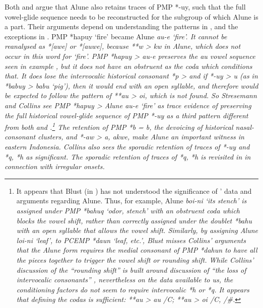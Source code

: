 Both \citet[139]{Stresemann1927} and \citet[51f]{Collins1983} argue
that Alune also retains traces of PMP *-uy,
such that the full vowel-glide sequence needs to be reconstructed
for the  subgroup of which Alune is a part.
Their arguments depend on understanding the patterns in ,
and the exceptions in .
PMP *hapuy ‘fire’ became Alune \it{au-e} ‘fire’.
It cannot be reanalysed as *[awe] or *[auwe],
because **w > \it{kw} in Alune,
which does not occur in this word for ‘fire’.
PMP *hapuy > \it{au-e} preserves the \it{au} vowel sequence seen
in example , but it does not have an obstruent as the coda which conditions that.
It does lose the intervocalic historical consonant *p > {\0}
and if *-uy > \it{u} (as in *babuy > \it{babu} ‘pig’),
then it would end with an open syllable,
and therefore would be expected to follow the pattern of **au
> \it{oi}, which is not found.
So Stresemann and Collins see PMP *hapuy > Alune \it{au-e} ‘fire’
as trace evidence of preserving the full historical vowel-glide
sequence of PMP *-uy as a third pattern different from both 
and .\footnote{
		It appears that Blust (in \citealp{BlustTrussel2020})
		has not understood the significance of \citeauthor{Collins1983}’
		\citeyear[40--52]{Collins1983} data and arguments regarding Alune.
		Thus, for example, Alune \it{boi-ni} ‘its stench’ is assigned
		under PMP *bahuq ‘odor,
		stench’ with an obstruent coda which blocks the vowel shift,
		rather than correctly assigned under the doublet *bahu with an
		open syllable that allows the vowel shift.
		Similarly, by assigning Alune \it{loi-ni} ‘leaf’,
		to PCEMP *daun ‘leaf,
		etc.’, Blust misses Collins’ arguments that the Alune form requires
		the medial consonant of PMP *dahun to have all the pieces together
		to trigger the vowel shift or rounding shift.
		While Collins' discussion of the “rounding shift” is built around
		discussion of “the loss of intervocalic consonants” \citep[41ff]{Collins1983},
		nevertheless on the data available to us,
		the conditioning factors do not seem to require intervocalic *h or *q.
		It appears that defining the codas is sufficient: **au > \it{au}
		/{\gap}C\tsc{[+obstruent]}{\#}; **au > \it{oi} /{\gap}C\tsc{[+continuant]}{\#},
		/{\gap}{\#}.} 
The retention of PMP *b = \it{b},
the devoicing of historical nasal-consonant clusters,
and *-aw > \it{a,
akwe}, make Alune an important witness in eastern Indonesia.
Collins also sees the sporadic retention of traces of *-uy
and *q, *h as significant.
The sporadic retention of traces of *q,
*h is revisited in  in connection with irregular onsets.
